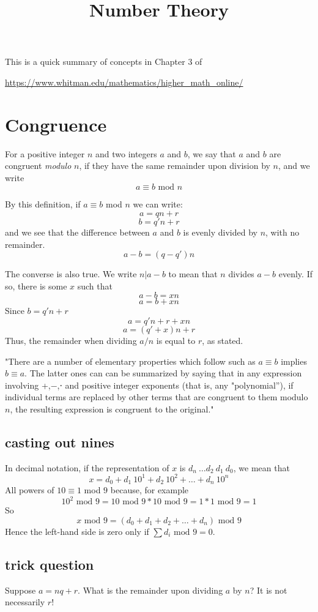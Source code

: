 \documentclass[11pt, oneside]{article}
\title{Number Theory}
\date{}
\begin{document}
\maketitle
\Large

This is a quick summary of concepts in Chapter 3 of 

\url{https://www.whitman.edu/mathematics/higher_math_online/}
\section*{Congruence}

For a positive integer $n$ and two integers $a$ and $b$, we say that $a$ and $b$ are congruent \emph{modulo} $n$, if they have the same remainder upon division by $n$, and we write
\[ a \equiv b \text{ mod } n \]

By this definition, if $a \equiv b$ mod $n$ we can write:
\[ a = qn + r \]
\[ b = q'n + r \]
and we see that the difference between $a$ and $b$ is evenly divided by $n$, with no remainder.
\[ a - b = (q - q')n \]

The converse is also true.  We write $n | a - b$ to mean that $n$ divides $a - b$ evenly.  If so, there is some $x$ such that
\[ a - b = xn \]
\[ a = b + xn \]
Since $b = q'n + r$
\[ a = q'n + r + xn \]
\[ a = (q' + x)n + r \]
Thus, the remainder when dividing $a/n$ is equal to $r$, as stated.

"There are a number of elementary properties which follow such as $a \equiv b$ implies $b \equiv a$.  The latter ones can can be summarized by saying that in any expression involving +,−,⋅ and positive integer exponents (that is, any "polynomial''), if individual terms are replaced by other terms that are congruent to them modulo $n$, the resulting expression is congruent to the original."

\subsection*{casting out nines}
In decimal notation, if the representation of $x$ is $d_n \ \dots d_2 \ d_1 \ d_0$, we mean that
\[ x = d_0 + d_1 \ 10^1 + d_2 \ 10^2 + \dots + d_n \ 10^n \]
All powers of $10 \equiv 1$ mod $9$ because, for example
\[ 10^2 \text{ mod } 9 = 10 \text{ mod } 9 * 10 \text{ mod } 9 = 1 * 1 \text{ mod } 9 = 1 \]
So
\[ x \text{ mod } 9 = (d_0 + d_1 + d_2 + \dots + d_n)  \text{ mod } 9 \]
Hence the left-hand side is zero only if $\sum d_i \text{ mod } 9 = 0$.

\subsection*{trick question}
Suppose $a = nq + r$.  What is the remainder upon dividing $a$ by $n$?  It is not necessarily $r$!
\end{document}
